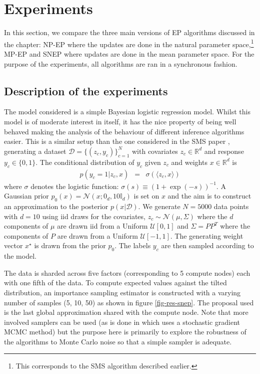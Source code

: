 \section{\label{dist-ep-exps}Experiments}

In this section, we compare the three main versions of EP algorithms discussed in the chapter: NP-EP where the updates are done in the natural parameter space,\footnote{This corresponds to the SMS algorithm described earlier.} MP-EP and SNEP where updates are done in the mean parameter space. For the purpose of the experiments, all algorithms are ran in a synchronous fashion. 

\subsection{Description of the experiments}

The model considered is a simple Bayesian logistic regression model. Whilst this model is of moderate interest in itself, it has the nice property of being well behaved making the analysis of the behaviour of different inference algorithms easier. This is a similar setup than the one considered in the SMS paper \citep{xu14}, generating a dataset $\mathcal D=\{(z_c, y_c)\}_{c=1}^N$ with covariates $z_c\in\mathbb R^d$ and response $y_c\in\{0,1\}$. The conditional distribution of $y_c$ given $z_c$ and weights $x\in\mathbb R^d$  is 
\begin{eqnarray}
    p(y_c=1|z_c, x) &=& \sigma(\langle z_c, x\rangle )
\end{eqnarray}
where $\sigma$ denotes the logistic function: $\sigma(s)\equiv (1+\exp(-s))^{-1}$. A Gaussian prior $p_0(x) = \mathcal N(x; 0_d, 10\mathbb I_d)$ is set on $x$ and the aim is to construct an approximation to the posterior $p(x|\mathcal D)$. We generate $N=5000$ data points with $d=10$ using iid draws for the covariates, $z_c\sim\mathcal N(\mu, \Sigma)$ where the $d$ components of $\mu$ are drawn iid from a Uniform $\mathcal U[0,1]$ and $\Sigma=PP^T$ where the components of $P$ are drawn from a Uniform $\mathcal U[-1,1]$. The generating weight vector $x^\star$ is drawn from the prior $p_0$. The labels $y_c$ are then sampled according to the model.

The data is sharded across five factors (corresponding to 5 compute nodes) each with one fifth of the data. To compute expected values against the tilted distribution, an importance sampling estimator is constructed with a varying number of samples (5, 10, 50) as shown in figure \ref{fig-res-snep}. The proposal used is the last global approximation shared with the compute node. Note that more involved samplers can be used (as is done in \citet{hasenclever16} which uses a stochastic gradient MCMC method) but the purpose here is primarily to explore the robustness of the algorithms to Monte Carlo noise so that a simple sampler is adequate. 

